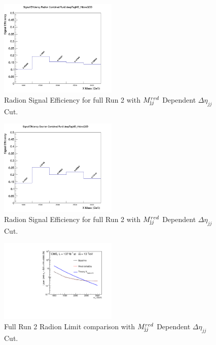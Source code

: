 \begin{figure}[!htb]
	\centering
	\includegraphics[width=0.5\textwidth]{Figures/sigEffrad_combined_Run2_deepTagMD_HbbvsQCD_mred.png}
	\caption{Radion Signal Efficiency for full Run 2 with $M_{\textrm jj}^{red}$ Dependent $\Delta \eta_{jj}$ Cut.}
	\label{fig:sigEffRadmred}
\end{figure}
\begin{figure}[!htb]
	\centering
	\includegraphics[width=0.5\textwidth]{Figures/sigEffgrav_combined_Run2_deepTagMD_HbbvsQCD_mred.png}
	\caption{Radion Signal Efficiency for full Run 2 with $M_{\textrm jj}^{red}$ Dependent $\Delta \eta_{jj}$ Cut.}
	\label{fig:sigEffGravmred}
\end{figure}
\begin{figure}[!htb]
	\centering
	\includegraphics[width=0.5\textwidth]{Figures/limits_HH_combine_137fb_deltaEtaComparison_RadNar_fixedmredDeltaEtaCheckRadion.pdf}
	\caption{Full Run 2 Radion Limit comparison with $M_{\textrm jj}^{red}$ Dependent $\Delta \eta_{jj}$ Cut.}
	\label{fig:RadionLimitFULLmred}
\end{figure}

